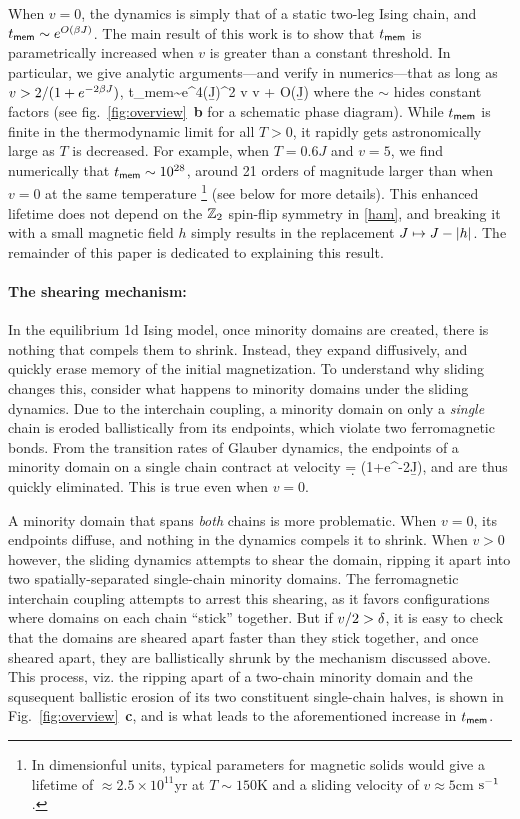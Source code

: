 \documentclass[prl,aps,twocolumn,groupedaddress,superscriptaddress,preprintnumbers,nobibnotes]{revtex4-2}
\newcommand{\tmem}{{t_{\sf mem}}}
\begin{document}
		When $v=0$, the dynamics is simply that of a static two-leg Ising chain, and $\tmem \sim e^{O( \b J)}$. The main result of this work is to show that $\tmem$ is parametrically increased when $v$ is greater than a constant threshold. In particular, we give analytic arguments---and verify in numerics---that as long as $v > 2/(1+e^{-2 \beta J})$,  
	\be \label{main_result} \tmem \sim  e^{4(\b J)^2 v \ln v  + O(\b J)}\ee
	where the $\sim$ hides constant factors (see fig.~\ref{fig:overview}~{\bf b} for a schematic phase diagram). While $\tmem$ is finite in the thermodynamic limit for all $T > 0$, it rapidly gets astronomically large as $T$ is decreased. For example, when $T = 0.6J$ and $v=5$, we find numerically that $\tmem \sim 10^{28}$, around 21 orders of magnitude larger than when $v=0$ at the same temperature \footnote{In dimensionful units, typical parameters for magnetic solids would give a lifetime of $\approx 2.5\times 10^{11}$yr at $T \sim 150$K and a sliding velocity of $v \approx 5$cm ${\rm s}^{-1}$ \cite{angst2012strongly}.} (see below for more details). This enhanced lifetime does not depend on the $\mathbb{Z}_2$ spin-flip symmetry in \eqref{ham}, and breaking it with a small magnetic field $h$ simply results in the replacement $J \mapsto J-|h|$.
	The remainder of this paper is dedicated to explaining this result. 
	
	

	

	
	\paragraph*{The shearing mechanism: } In the equilibrium 1d Ising model, once minority domains are created, there is nothing that compels them to shrink. Instead, they expand diffusively, and quickly erase memory of the initial magnetization. 
	To understand why sliding changes this, consider what happens to minority domains under the sliding dynamics. Due to the interchain coupling, a minority domain on only a {\it single} chain is eroded ballistically from its endpoints, which violate two ferromagnetic bonds. From the transition rates of Glauber dynamics, the endpoints of a minority domain on a single chain contract at velocity 
	\be \d = (1+e^{-2\b J})\inv,\ee 
	and are thus quickly eliminated. This is true even when $v=0$.
	
	A minority domain that spans {\it both} chains is more problematic. When $v=0$, its endpoints diffuse, and nothing in the dynamics compels it to shrink. When $v>0$ however, the sliding dynamics attempts to shear the domain, ripping it apart into two spatially-separated single-chain minority domains. The ferromagnetic interchain coupling attempts to arrest this shearing, as it favors configurations where domains on each chain ``stick'' together. But if $v/2 >\delta$, it is easy to check that the domains are sheared apart faster than they stick together, and once sheared apart, they are ballistically shrunk by the mechanism discussed above. This process, viz. the ripping apart of a two-chain minority domain and the squsequent ballistic erosion of its two constituent single-chain halves, is shown in Fig.~\ref{fig:overview}~{\bf c}, and is what leads to the aforementioned increase in $\tmem$. 
	
\end{document}
